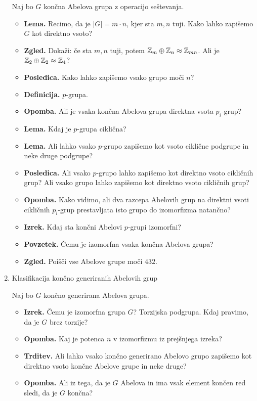 \begin{enumerate}
    Naj bo \(G\) končna Abelova grupa z operacijo seštevanja.
    \begin{itemize}
        \item \textbf{Lema.} Recimo, da je \(|G| = m \cdot n\), kjer sta \(m, n\) tuji. Kako lahko zapišemo \(G\) kot direktno vsoto?
        \item \textbf{Zgled.} Dokaži: če sta \(m, n\) tuji, potem \(\mathbb{Z}_m \oplus \mathbb{Z}_n \approx \mathbb{Z}_{mn}\). Ali je \(\mathbb{Z}_2 \oplus \mathbb{Z}_2 \approx \mathbb{Z}_4\)?
        \item \textbf{Posledica.} Kako lahko zapišemo vsako grupo moči \(n\)?
        \item \textbf{Definicija.} \(p\)-grupa.
        \item \textbf{Opomba.} Ali je vsaka končna Abelova grupa direktna vsota \(p_i\)-grup?
        \item \textbf{Lema.} Kdaj je \(p\)-grupa ciklična?
        \item \textbf{Lema.} Ali lahko vsako \(p\)-grupo zapišemo kot vsoto ciklične podgrupe in neke druge podgrupe?
        \item \textbf{Posledica.} Ali vsako \(p\)-grupo lahko zapišemo kot direktno vsoto cikličnih grup? Ali vsako grupo lahko zapišemo kot direktno vsoto cikličnih grup?
        \item \textbf{Opomba.} Kako vidimo, ali dva razcepa Abelovih grup na direktni vsoti cikličnih \(p_i\)-grup prestavljata isto grupo do izomorfizma natančno?
        \item \textbf{Izrek.} Kdaj sta končni Abelovi \(p\)-grupi izomorfni?
        \item \textbf{Povzetek.} Čemu je izomorfna vsaka končna Abelova grupa? \todo{*}
        \item \textbf{Zgled.} Poišči vse Abelove grupe moči \(432\).
    \end{itemize}

    \item Klasifikacija končno generiranih Abelovih grup
    
    Naj bo \(G\) končno generirana Abelova grupa.
    \begin{itemize}
        \item \textbf{Izrek.} Čemu je izomorfna grupa \(G\)? Torzijska podgrupa. Kdaj pravimo, da je \(G\) brez torzije? \todo{*}
        \item \textbf{Opomba.} Kaj je potenca \(n\) v izomorfizmu iz prejšnjega izreka?
        \item \textbf{Trditev.} Ali lahko vsako končno generirano Abelovo grupo zapišemo kot direktno vsoto končne Abelove grupe in neke druge?
        \item \textbf{Opomba.} Ali iz tega, da je \(G\) Abelova in ima vsak element končen red sledi, da je \(G\) končna?
    \end{itemize}
\end{enumerate}